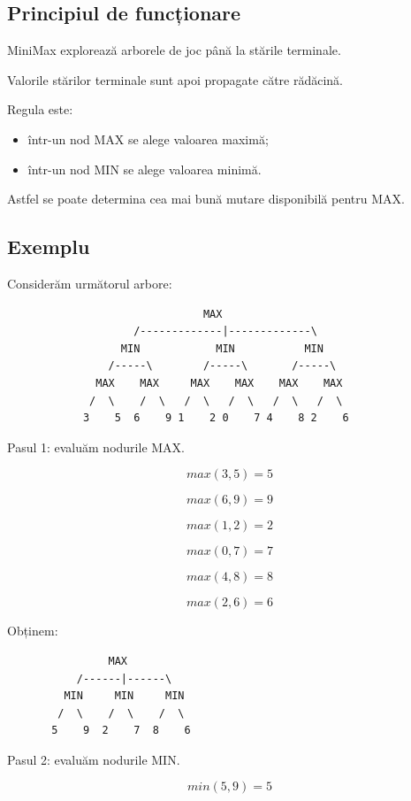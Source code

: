 \documentclass[12pt,a4paper]{article}
\begin{document}
\subsection{Principiul de funcționare}

MiniMax explorează arborele de joc până la stările terminale.

Valorile stărilor terminale sunt apoi propagate către rădăcină.

Regula este:

\begin{itemize}
\item într-un nod MAX se alege valoarea maximă;
\item într-un nod MIN se alege valoarea minimă.
\end{itemize}

Astfel se poate determina cea mai bună mutare disponibilă pentru MAX.

\subsection{Exemplu}

Considerăm următorul arbore:

\begin{verbatim}
                               MAX
                    /-------------|-------------\
                  MIN            MIN           MIN
                /-----\        /-----\       /-----\
              MAX    MAX     MAX    MAX    MAX    MAX
             /  \    /  \   /  \   /  \   /  \   /  \
            3    5  6    9 1    2 0    7 4    8 2    6
\end{verbatim}


Pasul 1: evaluăm nodurile MAX.

\[
max(3,5)=5
\]

\[
max(6,9)=9
\]

\[
max(1,2)=2
\]

\[
max(0,7)=7
\]

\[
max(4,8)=8
\]

\[
max(2,6)=6
\]

Obținem:

\begin{verbatim}
                MAX
           /------|------\
         MIN     MIN     MIN
        /  \    /  \    /  \
       5    9  2    7  8    6
\end{verbatim}

Pasul 2: evaluăm nodurile MIN.

\[
min(5,9)=5
\]
\end{document}
